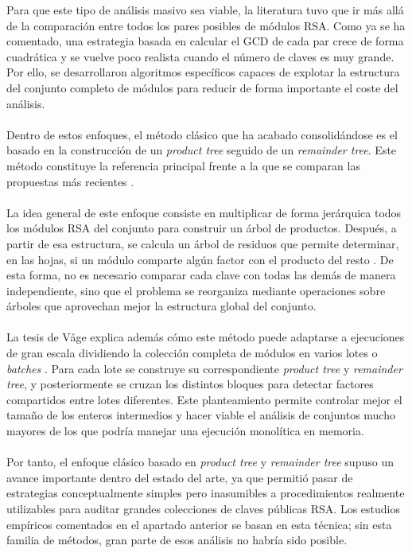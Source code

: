 Para que este tipo de análisis masivo sea viable, la literatura tuvo que ir más allá de la comparación entre todos los pares posibles de módulos RSA. Como ya se ha comentado, una estrategia basada en calcular el GCD de cada par crece de forma cuadrática y se vuelve poco realista cuando el número de claves es muy grande. Por ello, se desarrollaron algoritmos específicos capaces de explotar la estructura del conjunto completo de módulos para reducir de forma importante el coste del análisis.
\\
\\
Dentro de estos enfoques, el método clásico que ha acabado consolidándose es el basado en la construcción de un \textit{product tree} seguido de un \textit{remainder tree}. Este método constituye la referencia principal frente a la que se comparan las propuestas más recientes \citep{vage2022finding,pelofske2024efficient}.
\\
\\
La idea general de este enfoque consiste en multiplicar de forma jerárquica todos los módulos RSA del conjunto para construir un árbol de productos. Después, a partir de esa estructura, se calcula un árbol de residuos que permite determinar, en las hojas, si un módulo comparte algún factor con el producto del resto \citep{pelofske2024efficient}. De esta forma, no es necesario comparar cada clave con todas las demás de manera independiente, sino que el problema se reorganiza mediante operaciones sobre árboles que aprovechan mejor la estructura global del conjunto.
\\
\\
La tesis de Våge explica además cómo este método puede adaptarse a ejecuciones de gran escala dividiendo la colección completa de módulos en varios lotes o \textit{batches} \citep{vage2022finding}. Para cada lote se construye su correspondiente \textit{product tree} y \textit{remainder tree}, y posteriormente se cruzan los distintos bloques para detectar factores compartidos entre lotes diferentes. Este planteamiento permite controlar mejor el tamaño de los enteros intermedios y hacer viable el análisis de conjuntos mucho mayores de los que podría manejar una ejecución monolítica en memoria.
\\
\\
Por tanto, el enfoque clásico basado en \textit{product tree} y \textit{remainder tree} supuso un avance importante dentro del estado del arte, ya que permitió pasar de estrategias conceptualmente simples pero inasumibles a procedimientos realmente utilizables para auditar grandes colecciones de claves públicas RSA. Los estudios empíricos comentados en el apartado anterior se basan en esta técnica; sin esta familia de métodos, gran parte de esos análisis no habría sido posible.
